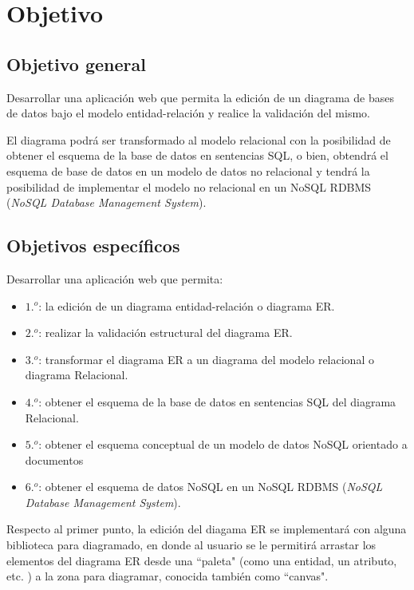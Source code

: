 \section{Objetivo}


\subsection*{Objetivo general}
Desarrollar una aplicación web que permita la edición de un diagrama de bases de datos bajo el modelo entidad-relación y realice la validación del mismo.


El diagrama podrá ser transformado al modelo relacional con la posibilidad de obtener el esquema de la base de datos en sentencias SQL, o bien, obtendrá el esquema de base de datos en un modelo de datos no relacional y tendrá la posibilidad de implementar el modelo no relacional en un NoSQL RDBMS (\textit{NoSQL Database Management System}).

\subsection*{Objetivos específicos}

Desarrollar una aplicación web que permita:

\begin{itemize}
    \item $1.^{o}$: la edición de un diagrama entidad-relación o diagrama ER.
    \item $2.^{o}$: realizar la validación estructural del diagrama ER.
    \item $3.^{o}$: transformar el diagrama ER a un diagrama del modelo relacional o diagrama Relacional.
    \item $4.^{o}$: obtener el esquema de la base de datos en sentencias SQL del diagrama Relacional.
    \item $5.^{o}$: obtener el esquema conceptual de un modelo de datos NoSQL orientado a documentos
    \item $6.^{o}$: obtener el esquema de datos NoSQL en un NoSQL RDBMS (\textit{NoSQL Database Management System}).
\end{itemize}

Respecto al primer punto, la edición del diagama ER se implementará con alguna biblioteca para diagramado, en donde al usuario se le permitirá arrastar los elementos del diagrama ER desde una ``paleta" (como una entidad, un atributo, etc. ) a la zona para diagramar, conocida también como ``canvas".


